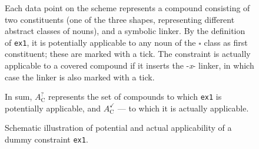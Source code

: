 \documentclass[10pt, a4paper]{article}
\begin{document}
\begin{figure}[!ht]
\begin{tcolorbox}[left=0.2em, right=0.2em]












\vspace{-1.8em}

Each data point on the scheme represents a compound consisting of two constituents (one of the three shapes, representing different abstract classes of nouns), and a symbolic linker. By the definition of \texttt{ex1}, it is potentially applicable to any noun of the $\square$ class as first constituent; these are marked with a tick. The constraint is actually applicable to a covered compound if it inserts the -\textit{x}- linker, in which case the linker is also marked with a tick.

In sum, $A^{\bm{?}}_{\mathrm{C}}$ represents the set of compounds to which \texttt{ex1} is potentially applicable, and $A^{\checkmark}_{\mathrm{C}}$ --- to which it is actually applicable.

\end{tcolorbox}

\caption{Schematic illustration of potential and actual applicability of a dummy constraint \texttt{ex1}.}


\label{fig_reg_cov}
\end{figure}
\end{document}
